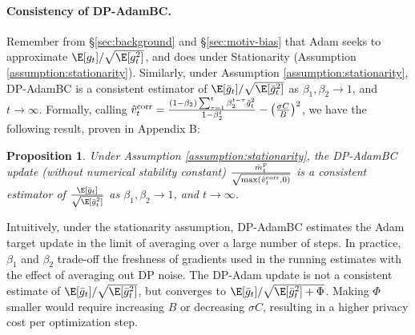 \documentclass[letterpaper]{article} %
\newtheorem{proposition}{Proposition}
\begin{document}
\paragraph{Consistency of DP-AdamBC.}
Remember from \S\ref{sec:background} and \S\ref{sec:motiv-bias} that Adam seeks to approximate $\E[g_t]/\sqrt{\E[g_t^2]}$, and does under Stationarity (Assumption \ref{assumption:stationarity}).
Similarly, under Assumption \ref{assumption:stationarity}, DP-AdamBC is a consistent estimator of $\E[\bar{g}_t]/\sqrt{\E[\bar{g}_t^2]}$ as $\beta_1, \beta_2 \rightarrow 1$, and $t \rightarrow \infty$. Formally, calling $\hat{v}_t^{\textnormal{corr}} = \frac{(1-\beta_2)\sum_{\tau=1}^{t}\beta_2^{t-\tau}\Tilde{g}_t^2}{1-\beta_2^t} - \big( \frac{\sigma C}{B} \big)^2$, we have the following result, proven in Appendix B:
\begin{proposition}\label{proposition:consistent}
Under Assumption \ref{assumption:stationarity}, the DP-AdamBC update (without numerical stability constant) $\frac{\hat{m}_t^p}{\sqrt{\max(\hat{v}_t^{\textnormal{corr}}, 0)}}$ is a consistent estimator of $\frac{\E[\bar{g}_t]}{\sqrt{\E[\bar{g}_t^2]}}$ as $\beta_1, \beta_2 \rightarrow 1$, and $t \rightarrow \infty$.
\end{proposition}
Intuitively, under the stationarity assumption, DP-AdamBC estimates the Adam target update in the limit of averaging over a large number of steps. In practice, $\beta_1$ and $\beta_2$ trade-off the freshness of gradients used in the running estimates with the effect of averaging out DP noise. The DP-Adam update is not a consistent estimate of $\E[\bar{g}_t]/\sqrt{\E[\bar{g}_t^2]}$, but converges to $\E[\bar{g}_t]/\sqrt{\E[\bar{g}_t^2] + \Phi}$. Making $\Phi$ smaller would require increasing $B$ or decreasing $\sigma C$, resulting in a higher privacy cost per optimization step.
\end{document}
